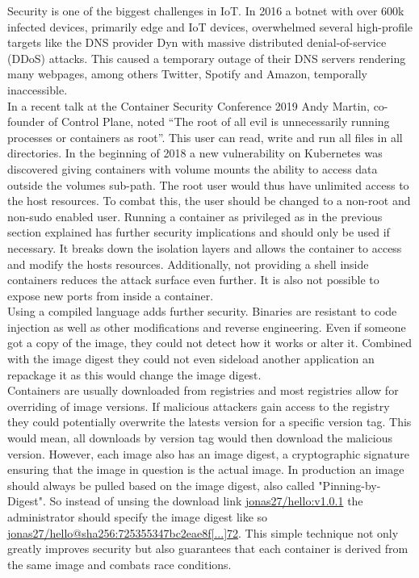 Security is one of the biggest challenges in IoT. In 2016 a botnet with over 600k infected devices, primarily edge and IoT devices, overwhelmed several high-profile targets like the DNS provider Dyn with massive distributed denial-of-service (DDoS) attacks. This caused a temporary outage of their DNS servers rendering many webpages, among others  Twitter, Spotify and Amazon, temporally inaccessible. \\
In a recent talk at the Container Security Conference 2019 Andy Martin, co-founder of Control Plane, noted ``The root of all evil is unnecessarily running processes or containers as root''\cite{RootlessContainerSecurityTalk0:online}. This user can read, write and run all files in all directories. In the beginning of 2018 a new vulnerability on Kubernetes was discovered giving containers with volume mounts the ability to access data outside the volumes sub-path. The root user would thus have unlimited access to the host resources. To combat this, the user should be changed to a non-root and non-sudo enabled user. Running a container as privileged as in the previous section explained has further security implications and should only be used if necessary. It breaks down the isolation layers and allows the container to access and modify the hosts resources. Additionally, not providing a shell inside containers reduces the attack surface even further. It is also not possible to expose new ports from inside a container.\\
Using a compiled language adds further security. Binaries are resistant to code injection as well as other modifications and reverse engineering. Even if someone got a copy of the image, they could not detect how it works or alter it. Combined with the image digest they could not even sideload another application an repackage it as this would change the image digest. \\
Containers are usually downloaded from registries and most registries allow for overriding of image versions. If malicious attackers gain access to the registry they could potentially overwrite the latests version for a specific version tag. This would mean, all downloads by version tag would then download the malicious version. However, each image also has an image digest, a cryptographic signature ensuring that the image in question is the actual image. In production an image should always be pulled based on the image digest, also called "Pinning-by-Digest". So instead of unsing the download link \url{jonas27/hello:v1.0.1} the administrator should specify the image digest like so \url{jonas27/hello@sha256:725355347bc2eae8f[...]72}. This simple technique not only greatly improves security but also guarantees that each container is derived from the same image and combats race conditions.\\


